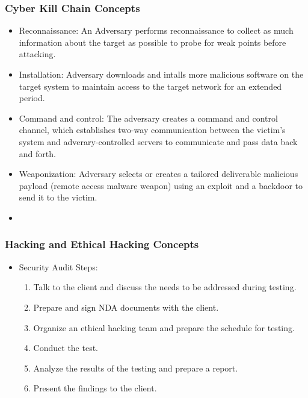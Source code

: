 \subsubsection{Cyber Kill Chain Concepts}
\begin{itemize}
    \item Reconnaissance: An Adversary performs reconnaissance to collect as much information about the target as possible to probe for weak points before attacking.
    \item Installation: Adversary downloads and intalls more malicious software on the target system to maintain access to the target network for an extended period.
    \item Command and control: The adversary creates a command and control channel, which establishes two-way communication between the victim's system and adverary-controlled servers to communicate and pass data back and forth.
    \item Weaponization: Adversary selects or creates a tailored deliverable malicious payload (remote access malware weapon) using an exploit and a backdoor to send it to the victim.
    \item
\end{itemize}
\subsubsection{Hacking and Ethical Hacking Concepts}
\begin{itemize}
    \item Security Audit Steps:
    \begin{enumerate}
        \item Talk to the client and discuss the needs to be addressed during testing.
        \item Prepare and sign NDA documents with the client.
        \item Organize an ethical hacking team and prepare the schedule for testing.
        \item Conduct the test.
        \item Analyze the results of the testing and prepare a report.
        \item Present the findings to the client.
    \end{enumerate}
\end{itemize}
